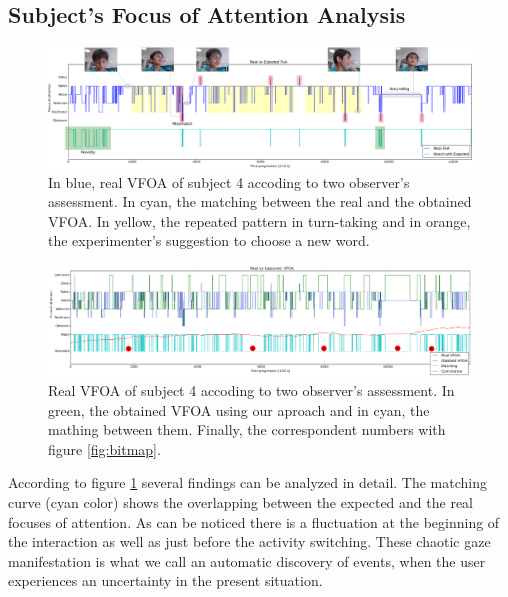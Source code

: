 \documentclass{sig-alternate}
\begin{document}
\subsection{Subject's Focus of Attention Analysis}

\begin{figure}
    \centering
    \includegraphics[width=1.8\columnwidth]{realExpected}
    \caption{\small In blue, real VFOA of subject 4 accoding to two observer's assessment. In cyan, the matching between the real and the obtained VFOA. In yellow, the repeated pattern in turn-taking and in orange, the experimenter's suggestion to choose a new word.}
    \label{fig:realExpected}
    
\end{figure}

\begin{figure}
    \centering
    \includegraphics[width=1.81\columnwidth]{realCaptured}
    \caption{\small Real VFOA of subject 4 accoding to two observer's assessment. In green, the obtained VFOA using our aproach and in cyan, the mathing between them. Finally, the correspondent numbers with figure \ref{fig:bitmap}.}
    \label{fig:realCaptured}
\end{figure}

According to figure \ref{fig:realExpected} several findings can be analyzed in detail. The matching curve (cyan color) shows the overlapping between the expected and the real focuses of attention. As can be noticed there is a fluctuation at the beginning of the interaction as well as just before the activity switching. These chaotic gaze manifestation is what we call an automatic discovery of events, when the user experiences an uncertainty in the present situation. 
\end{document}
